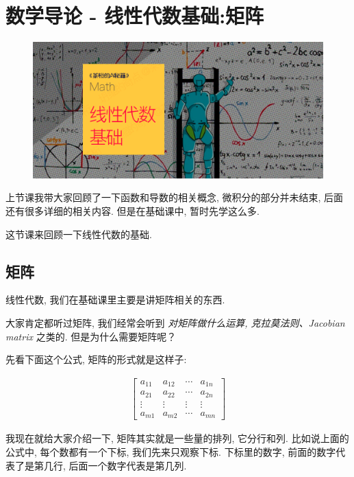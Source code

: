 \chapter{数学导论 - 线性代数基础:矩阵}


\begin{figure}[ht]
  \centering
  \includegraphics[width=1\textwidth]{asset/茶桁的AI秘籍_Math_3.png}
\end{figure}

\newpage

上节课我带大家回顾了一下函数和导数的相关概念, 微积分的部分并未结束, 后面还有很多详细的相关内容. 但是在基础课中, 暂时先学这么多. 

这节课来回顾一下线性代数的基础. 

\hypertarget{3.线性代数基础}{}
\section{矩阵}

线性代数, 我们在基础课里主要是讲矩阵相关的东西. 

大家肯定都听过矩阵, 我们经常会听到 \textit{对矩阵做什么运算, 克拉莫法则、Jacobian matrix} 之类的. 但是为什么需要矩阵呢？

先看下面这个公式, 矩阵的形式就是这样子:

\begin{align*}
  \begin{bmatrix}
    a_{11} & a_{12} & \cdots & a_{1n} \\
    a_{21} & a_{22} & \cdots & a_{2n} \\
    \vdots & \vdots & \vdots & \vdots \\
    a_{m1} & a_{m2} & \cdots & a_{mn}
  \end{bmatrix}
\end{align*}

我现在就给大家介绍一下, 矩阵其实就是一些量的排列, 它分行和列. 比如说上面的公式中, 每个数都有一个下标, 我们先来只观察下标. 下标里的数字, 前面的数字代表了是第几行, 后面一个数字代表是第几列. 


